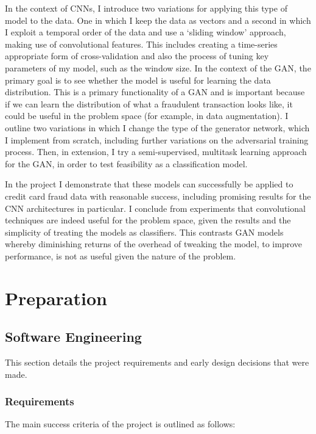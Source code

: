 \documentclass[12pt,a4paper,twoside]{report}
\begin{document}
In the context of CNNs, I introduce two variations for applying this type of model to the data. One in which I keep the data as vectors and a second in which I exploit a temporal order of the data and use a `sliding window' approach, making use of convolutional features. This includes creating a time-series appropriate form of cross-validation and also the process of tuning key parameters of my model, such as the window size. In the context of the GAN, the primary goal is to see whether the model is useful for learning the data distribution. This is a primary functionality of a GAN and is important because if we can learn the distribution of what a fraudulent transaction looks like, it could be useful in the problem space (for example, in data augmentation).  I outline two variations in which I change the type of the generator network, which I implement from scratch, including further variations on the adversarial training process.  Then, in extension, I try a semi-supervised, multitask learning approach for the GAN, in order to test feasibility as a classification model. 

In the project I demonstrate that these models can successfully be applied to credit card fraud data with reasonable success, including promising results for the CNN architectures in particular. I conclude from experiments that convolutional techniques are indeed useful for the problem space, given the results and the simplicity of treating the models as classifiers. This contrasts GAN models whereby diminishing returns of the overhead of tweaking the model, to improve performance, is not as useful given the nature of the problem.

\chapter{Preparation} \label{preparation}

\section{Software Engineering}

This section details the project requirements and early design decisions that were made.

\subsection{Requirements}
The main success criteria of the project is outlined as follows:
\end{document}
